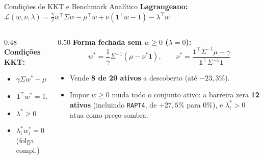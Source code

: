 \documentclass[aspectratio=43]{beamer}
\begin{document}
\begin{frame}{Condições de KKT e Benchmark Analítico}
  \textbf{Lagrangeano:}
  $\mathcal{L}(w,\nu,\lambda) = \frac{\gamma}{2}w^\top\Sigma w - \mu^\top w + \nu(\mathbf{1}^\top w - 1) - \lambda^\top w$

  \vspace{0.15cm}
  \begin{columns}[T]
    \begin{column}{0.48\textwidth}
      \textbf{Condições KKT:}
      \begin{itemize}
        \item $\gamma\Sigma w^* - \mu + \nu^*\mathbf{1} - \lambda^* = 0$
        \item $\mathbf{1}^\top w^* = 1,\; w^* \ge 0$
        \item $\lambda^* \ge 0$
        \item $\lambda_i^* w_i^* = 0 \;\; \forall i$ (folga compl.)
      \end{itemize}
    \end{column}
    \begin{column}{0.50\textwidth}
      \textbf{Forma fechada sem $w \ge 0$ ($\lambda = 0$):}
      \[
        w^* = \frac{1}{\gamma}\Sigma^{-1}(\mu - \nu^*\mathbf{1}), \qquad
        \nu^* = \frac{\mathbf{1}^\top\Sigma^{-1}\mu - \gamma}{\mathbf{1}^\top\Sigma^{-1}\mathbf{1}}
      \]
      \small
      \begin{itemize}
        \item Vende \textbf{8 de 20 ativos} a descoberto (até $-23{,}3\%$).
        \item Impor $w \ge 0$ muda todo o conjunto ativo: a barreira zera \textbf{12 ativos} (incluindo \texttt{RAPT4}, de $+27{,}5\%$ para $0\%$), e $\lambda_i^* > 0$ atua como preço-sombra.
      \end{itemize}
    \end{column}
  \end{columns}
\end{frame}
\end{document}
